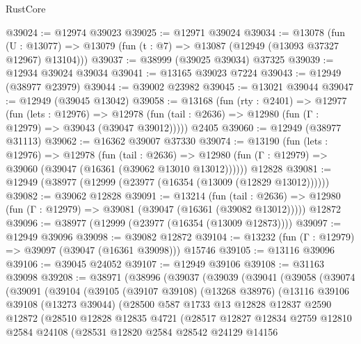 \begin{lexlean}{RustCore}
\begin{coremodule}
@39024 := @12974 @39023
@39025 := @12971 @39024
@39034 := @13078
    (fun (U : @13077) => @13079 (fun (t : @7) => @13087 (@12949 (@13093 @37327 @12967) @13104)))
@39037 := @38999 (@39025 @39034) @37325
@39039 := @12934 @39024 @39034
@39041 := @13165 @39023 @7224
@39043 := @12949 (@38977 @23979)
@39044 := @39002 @23982
@39045 := @13021 @39044
@39047 := @12949 (@39045 @13042)
@39058 := @13168
    (fun (rty : @2401) =>
    @12977
      (fun (lets : @12976) =>
      @12978 (fun (tail : @2636) => @12980 (fun (Γ : @12979) => @39043 (@39047 @39012)))))
    @2405
@39060 := @12949 (@38977 @31113)
@39062 := @16362 @39007 @37330
@39074 := @13190
    (fun (lets : @12976) =>
    @12978
      (fun (tail : @2636) =>
      @12980 (fun (Γ : @12979) => @39060 (@39047 (@16361 (@39062 @13010 @13012))))))
    @12828
@39081 := @12949 (@38977 (@12999 (@23977 (@16354 (@13009 (@12829 @13012))))))
@39082 := @39062 @12828
@39091 := @13214
    (fun (tail : @2636) => @12980 (fun (Γ : @12979) => @39081 (@39047 (@16361 (@39082 @13012)))))
    @12872
@39096 := @38977 (@12999 (@23977 (@16354 (@13009 @12873))))
@39097 := @12949 @39096
@39098 := @39082 @12872
@39104 := @13232 (fun (Γ : @12979) => @39097 (@39047 (@16361 @39098))) @15746
@39105 := @13116 @39096
@39106 := @39045 @24052
@39107 := @12949 @39106
@39108 := @31163 @39098
@39208 := @38971
    (@38996
      (@39037
        (@39039
          (@39041
            (@39058
              (@39074
                (@39091
                  (@39104
                    (@39105
                      (@39107 @39108)
                      (@13268 @38976)
                      (@13116
                        @39106
                        @39108
                        (@13273 @39044)
                        (@28500
                          @587
                          @1733
                          @13
                          @12828
                          @12837
                          @2590
                          @12872
                          (@28510
                            @12828
                            @12835
                            @4721
                            (@28517
                              @12827
                              @12834
                              @2759
                              @12810
                              @2584
                              @24108
                              (@28531
                                @12820
                                @2584
                                @28542
                                @24129
                                @14156

\end{coremodule}
\end{lexlean}
